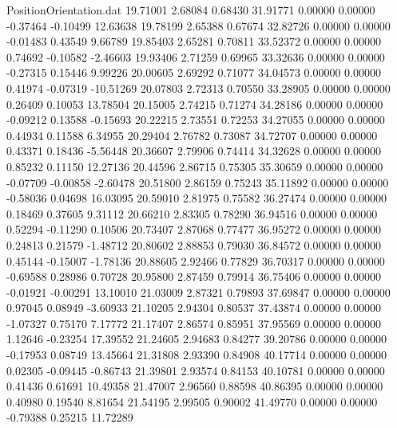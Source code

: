 \begin{filecontents}{PositionOrientation.dat}
  19.71001    2.68084    0.68430    31.91771    0.00000    0.00000   -0.37464   -0.10499   12.63638
  19.78199    2.65388    0.67674    32.82726    0.00000    0.00000   -0.01483    0.43549    9.66789
  19.85403    2.65281    0.70811    33.52372    0.00000    0.00000    0.74692   -0.10582   -2.46603
  19.93406    2.71259    0.69965    33.32636    0.00000    0.00000   -0.27315    0.15446    9.99226
  20.00605    2.69292    0.71077    34.04573    0.00000    0.00000    0.41974   -0.07319  -10.51269
  20.07803    2.72313    0.70550    33.28905    0.00000    0.00000    0.26409    0.10053   13.78504
  20.15005    2.74215    0.71274    34.28186    0.00000    0.00000   -0.09212    0.13588   -0.15693
  20.22215    2.73551    0.72253    34.27055    0.00000    0.00000    0.44934    0.11588    6.34955
  20.29404    2.76782    0.73087    34.72707    0.00000    0.00000    0.43371    0.18436   -5.56448
  20.36607    2.79906    0.74414    34.32628    0.00000    0.00000    0.85232    0.11150   12.27136
  20.44596    2.86715    0.75305    35.30659    0.00000    0.00000   -0.07709   -0.00858   -2.60478
  20.51800    2.86159    0.75243    35.11892    0.00000    0.00000   -0.58036    0.04698   16.03095
  20.59010    2.81975    0.75582    36.27474    0.00000    0.00000    0.18469    0.37605    9.31112
  20.66210    2.83305    0.78290    36.94516    0.00000    0.00000    0.52294   -0.11290    0.10506
  20.73407    2.87068    0.77477    36.95272    0.00000    0.00000    0.24813    0.21579   -1.48712
  20.80602    2.88853    0.79030    36.84572    0.00000    0.00000    0.45144   -0.15007   -1.78136
  20.88605    2.92466    0.77829    36.70317    0.00000    0.00000   -0.69588    0.28986    0.70728
  20.95800    2.87459    0.79914    36.75406    0.00000    0.00000   -0.01921   -0.00291   13.10010
  21.03009    2.87321    0.79893    37.69847    0.00000    0.00000    0.97045    0.08949   -3.60933
  21.10205    2.94304    0.80537    37.43874    0.00000    0.00000   -1.07327    0.75170    7.17772
  21.17407    2.86574    0.85951    37.95569    0.00000    0.00000    1.12646   -0.23254   17.39552
  21.24605    2.94683    0.84277    39.20786    0.00000    0.00000   -0.17953    0.08749   13.45664
  21.31808    2.93390    0.84908    40.17714    0.00000    0.00000    0.02305   -0.09445   -0.86743
  21.39801    2.93574    0.84153    40.10781    0.00000    0.00000    0.41436    0.61691   10.49358
  21.47007    2.96560    0.88598    40.86395    0.00000    0.00000    0.40980    0.19540    8.81654
  21.54195    2.99505    0.90002    41.49770    0.00000    0.00000   -0.79388    0.25215   11.72289

\end{filecontents}
